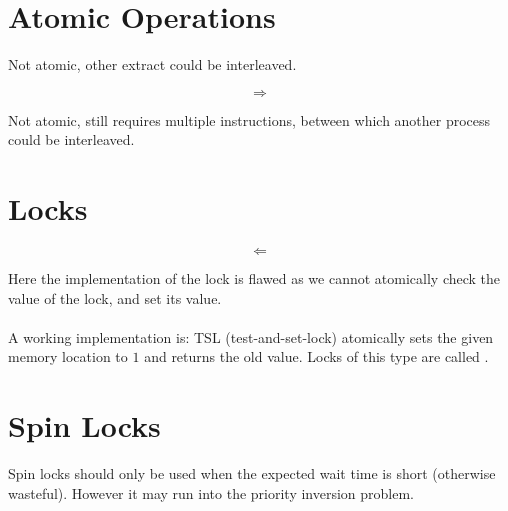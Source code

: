 \documentclass{report}
\begin{document}
    \section*{Atomic Operations}
        \begin{minipage}[t]{0.4 \textwidth}
            Not atomic, other extract could be interleaved.
        \end{minipage}
        \begin{minipage}[t]{0.2 \textwidth}
            \begin{huge}
                \[\Rightarrow\]
            \end{huge}
        \end{minipage}
        \begin{minipage}[t]{0.4 \textwidth}
            Not atomic, still requires multiple instructions, between which another process could be interleaved.
        \end{minipage}
    \section*{Locks}
        \begin{minipage}[t]{0.4\textwidth}
        \end{minipage}
        \begin{minipage}[t]{0.2 \textwidth}
            \begin{huge}
                \[\Leftarrow\]
            \end{huge}
        \end{minipage}
        \begin{minipage}[t]{0.4\textwidth}
        \end{minipage}
        Here the implementation of the lock is flawed as we cannot atomically check the value of the lock, and set its value.
        \\
        \\ A working implementation is:
        TSL (test-and-set-lock) atomically sets the given memory location to $1$ and returns the old value. Locks of this type are called .
    \section*{Spin Locks}
        Spin locks should only be used when the expected wait time is short (otherwise wasteful). However it may run into the priority inversion problem.
\end{document}
